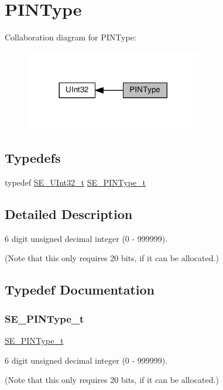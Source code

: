 \hypertarget{group__PINType}{}\section{P\+I\+N\+Type}
\label{group__PINType}
Collaboration diagram for P\+I\+N\+Type\+:\nopagebreak
\begin{figure}[H]
\begin{center}
\leavevmode
\includegraphics[width=218pt]{group__PINType}
\end{center}
\end{figure}
\subsection*{Typedefs}
\begin{DoxyCompactItemize}
\item 
typedef \hyperlink{group__UInt32_ga70bd4ecda3c0c85d20779d685a270cdb}{S\+E\+\_\+\+U\+Int32\+\_\+t} \hyperlink{group__PINType_ga30be98f3ca9ec3c8261d0bb63307bc85}{S\+E\+\_\+\+P\+I\+N\+Type\+\_\+t}
\end{DoxyCompactItemize}


\subsection{Detailed Description}
6 digit unsigned decimal integer (0 -\/ 999999).

(Note that this only requires 20 bits, if it can be allocated.) 

\subsection{Typedef Documentation}
\mbox{\label{group__PINType_ga30be98f3ca9ec3c8261d0bb63307bc85}} 
\subsubsection{\texorpdfstring{S\+E\+\_\+\+P\+I\+N\+Type\+\_\+t}{SE\_PINType\_t}}
{\footnotesize\ttfamily \hyperlink{group__PINType_ga30be98f3ca9ec3c8261d0bb63307bc85}{S\+E\+\_\+\+P\+I\+N\+Type\+\_\+t}}

6 digit unsigned decimal integer (0 -\/ 999999).

(Note that this only requires 20 bits, if it can be allocated.) 